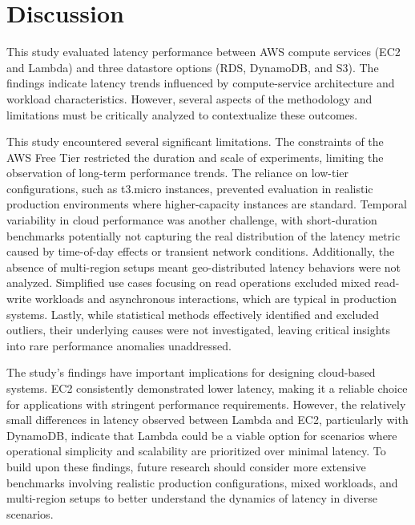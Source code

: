 \section{Discussion}
\label{cha:discuss}

This study evaluated latency performance between AWS compute services (EC2 and Lambda) and three datastore options (RDS, DynamoDB, and S3). The findings indicate latency trends influenced by compute-service architecture and workload characteristics. However, several aspects of the methodology and limitations must be critically analyzed to contextualize these outcomes.

This study encountered several significant limitations. The constraints of the AWS Free Tier restricted the duration and scale of experiments, limiting the observation of long-term performance trends. The reliance on low-tier configurations, such as t3.micro instances, prevented evaluation in realistic production environments where higher-capacity instances are standard. Temporal variability in cloud performance was another challenge, with short-duration benchmarks potentially not capturing the real distribution of the latency metric caused by time-of-day effects or transient network conditions. Additionally, the absence of multi-region setups meant geo-distributed latency behaviors were not analyzed. Simplified use cases focusing on read operations excluded mixed read-write workloads and asynchronous interactions, which are typical in production systems. Lastly, while statistical methods effectively identified and excluded outliers, their underlying causes were not investigated, leaving critical insights into rare performance anomalies unaddressed.

The study's findings have important implications for designing cloud-based systems. EC2 consistently demonstrated lower latency, making it a reliable choice for applications with stringent performance requirements. However, the relatively small differences in latency observed between Lambda and EC2, particularly with DynamoDB, indicate that Lambda could be a viable option for scenarios where operational simplicity and scalability are prioritized over minimal latency. To build upon these findings, future research should consider more extensive benchmarks involving realistic production configurations, mixed workloads, and multi-region setups to better understand the dynamics of latency in diverse scenarios.
